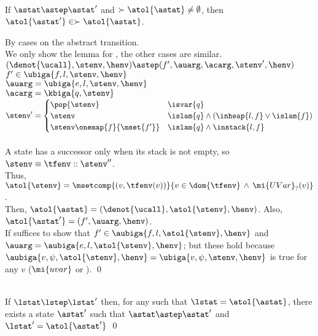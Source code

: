 \documentclass{LMCS}
\theoremstyle{definition} \newtheorem{property}[thm]{Property}
\begin{document}
\begin{lem}\label{lem:localsim} ~\\
If $\astat \astep \astat'$ and $\succ{\atol{\astat}} \neq \emptyset$,
then $\atol{\astat'} \in \succ{\atol{\astat}}$.
\end{lem}
\proof
By cases on the abstract transition. \\
We only show the lemma for , the other cases are similar. \\
$(\denot{\ucall}, \stenv, \henv) \astep (f', \auarg, \acarg, \stenv', \henv)$ \\
$f' \in \ubiga{f, l, \stenv, \henv}$ \\
$\auarg = \ubiga{e, l, \stenv, \henv}$ \\
$\acarg = \kbiga{q, \stenv}$ \\
$\stenv' =
\begin{cases}
  \pop{\stenv} & \isvar{q} \\
  \stenv & \islam{q} \land (\inheap{l, f} \lor \islam{f}) \\
  \stenv\onemap{f}{\mset{f'}} & \islam{q} \land \instack{l, f}
\end{cases}$ \\ ~\\
A \daueval{} state has a successor only when its stack is not empty,
so $\stenv \equiv \tfenv::\stenv''$. \\
Thus, $\atol{\stenv} = 
\msetcomp{(v, \tfenv(v))}{v \in \dom{\tfenv} \,\land\, \mi{UVar}_?(v)}$. \\
Then, $\atol{\astat} = (\denot{\ucall}, \atol{\stenv}, \henv)$. 
Also, $\atol{\astat'} = (f', \auarg, \henv)$. \\
If suffices to show that $f' \in \aubiga{f, l, \atol{\stenv}, \henv}$ and 
$\auarg = \aubiga{e, l, \atol{\stenv}, \henv}$; but these hold because 
$\aubiga{v, \psi, \atol{\stenv}, \henv} = \ubiga{v, \psi, \stenv, \henv}$ 
is true for any $v$ ($\mi{uvar}$ or \mulam{}).
\qed

\begin{lem}\label{lem:localsim-converse} ~\\
  If $\lstat \lstep \lstat'$ then, 
  for any \astat{} such that $\lstat = \atol{\astat}$, 
  there exists a state $\astat'$ such that 
  $\astat \astep \astat'$ and $\lstat' = \atol{\astat'}$
  \qed
\end{lem}
\end{document}
